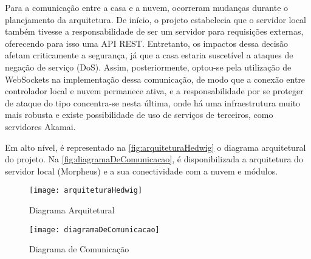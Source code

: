 Para a comunicação entre a casa e a nuvem, ocorreram mudanças durante o planejamento da arquitetura. De início, o projeto estabelecia que o servidor local também tivesse a responsabilidade de ser um servidor para requisições externas, oferecendo para isso uma API REST. Entretanto, os impactos dessa decisão afetam criticamente a segurança, já que a casa estaria suscetível a ataques de negação de serviço (DoS). Assim, posteriormente, optou-se pela utilização de WebSockets na implementação dessa comunicação, de modo que a conexão entre controlador local e nuvem permanece ativa, e a responsabilidade por se proteger de ataque do tipo concentra-se nesta última, onde há uma infraestrutura muito mais robusta e existe possibilidade de uso de serviços de terceiros, como servidores Akamai.

Em alto nível, é representado na \autoref{fig:arquiteturaHedwig} o diagrama arquitetural do projeto. Na \autoref{fig:diagramaDeComunicacao}, é disponibilizada a arquitetura do servidor local (Morpheus) e a sua conectividade com a nuvem e módulos.

\begin{figure}[H]
	\caption{\label{fig:arquiteturaHedwig}Diagrama Arquitetural}
	\begin{center}
	    \texttt{[image: arquiteturaHedwig]}
	\end{center}
\end{figure}

\begin{figure}[H]
	\caption{\label{fig:diagramaDeComunicacao}Diagrama de Comunicação}
	\begin{center}
	    \texttt{[image: diagramaDeComunicacao]}
	\end{center}
\end{figure}

